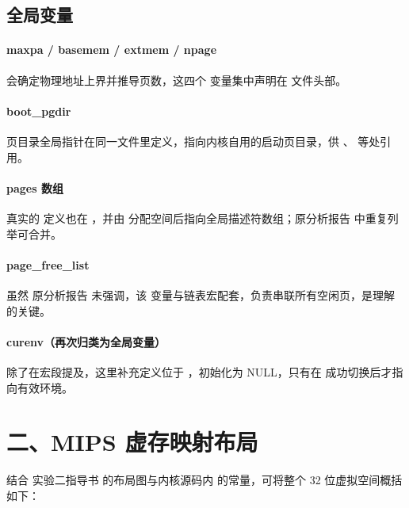 \documentclass[12pt,oneside]{ctexbook}
\begin{document}
\subsection*{全局变量}
\paragraph{maxpa / basemem / extmem / npage}
 会确定物理地址上界并推导页数，这四个  变量集中声明在  文件头部。

\paragraph{boot\_pgdir}
页目录全局指针在同一文件里定义，指向内核自用的启动页目录，供 、 等处引用。

\paragraph{pages 数组}
真实的  定义也在 ，并由  分配空间后指向全局描述符数组；原分析报告 中重复列举可合并。

\paragraph{page\_free\_list}
虽然 原分析报告 未强调，该  变量与链表宏配套，负责串联所有空闲页，是理解  的关键。

\paragraph{curenv（再次归类为全局变量）}
除了在宏段提及，这里补充定义位于 ，初始化为 NULL，只有在  成功切换后才指向有效环境。
\section*{二、MIPS 虚存映射布局}

结合 实验二指导书 的布局图与内核源码内  的常量，可将整个 32 位虚拟空间概括如下：
\end{document}
